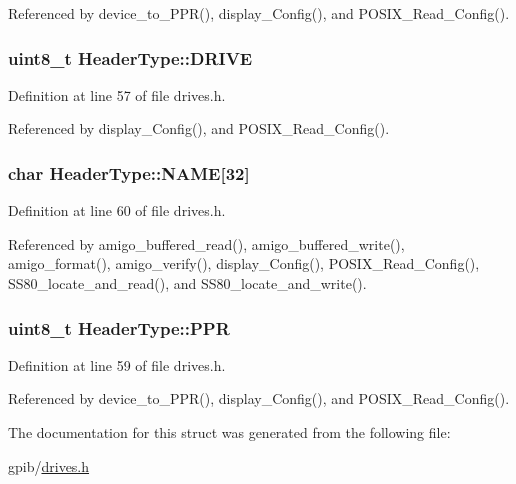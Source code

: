 Referenced by device\+\_\+to\+\_\+\+P\+P\+R(), display\+\_\+\+Config(), and P\+O\+S\+I\+X\+\_\+\+Read\+\_\+\+Config().

\subsubsection[{\texorpdfstring{D\+R\+I\+VE}{DRIVE}}]{\setlength{\rightskip}{0pt plus 5cm}uint8\+\_\+t Header\+Type\+::\+D\+R\+I\+VE}\hypertarget{structHeaderType_a02c17b1f4472794c5f79a9ea8749a922}{}\label{structHeaderType_a02c17b1f4472794c5f79a9ea8749a922}


Definition at line 57 of file drives.\+h.



Referenced by display\+\_\+\+Config(), and P\+O\+S\+I\+X\+\_\+\+Read\+\_\+\+Config().

\subsubsection[{\texorpdfstring{N\+A\+ME}{NAME}}]{\setlength{\rightskip}{0pt plus 5cm}char Header\+Type\+::\+N\+A\+ME\mbox{[}32\mbox{]}}\hypertarget{structHeaderType_aab6f096f40fee03da66178f67c730ff9}{}\label{structHeaderType_aab6f096f40fee03da66178f67c730ff9}


Definition at line 60 of file drives.\+h.



Referenced by amigo\+\_\+buffered\+\_\+read(), amigo\+\_\+buffered\+\_\+write(), amigo\+\_\+format(), amigo\+\_\+verify(), display\+\_\+\+Config(), P\+O\+S\+I\+X\+\_\+\+Read\+\_\+\+Config(), S\+S80\+\_\+locate\+\_\+and\+\_\+read(), and S\+S80\+\_\+locate\+\_\+and\+\_\+write().

\subsubsection[{\texorpdfstring{P\+PR}{PPR}}]{\setlength{\rightskip}{0pt plus 5cm}uint8\+\_\+t Header\+Type\+::\+P\+PR}\hypertarget{structHeaderType_ac642cdad0f3874495afa0ab687a56fd0}{}\label{structHeaderType_ac642cdad0f3874495afa0ab687a56fd0}


Definition at line 59 of file drives.\+h.



Referenced by device\+\_\+to\+\_\+\+P\+P\+R(), display\+\_\+\+Config(), and P\+O\+S\+I\+X\+\_\+\+Read\+\_\+\+Config().



The documentation for this struct was generated from the following file\+:\begin{DoxyCompactItemize}
\item 
gpib/\hyperlink{drives_8h}{drives.\+h}\end{DoxyCompactItemize}

